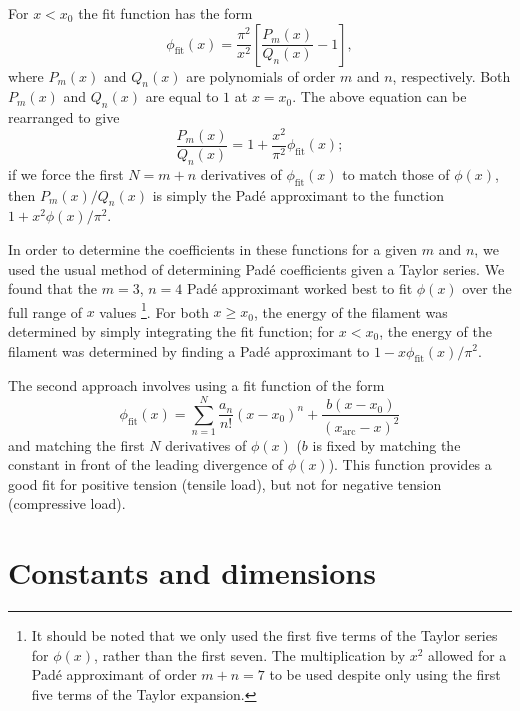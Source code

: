 \documentclass[pre,floatfix,twocolumn]{revtex4}
\begin{document}
For $x<x_0$ the fit function has the form
\[
\phi_{\text{fit}}(x) = \frac{\pi^2}{x^2}\left[\frac{P_{m}(x)}{Q_{n}(x)}-1\right],
\]
where $P_{m}(x)$ and $Q_{n}(x)$ are polynomials of order $m$ and $n$, respectively.  Both $P_{m}(x)$ and $Q_{n}(x)$ are equal to $1$ at $x=x_0$.  The above equation can be rearranged to give
\[
\frac{P_{m}(x)}{Q_{n}(x)} = 1 + \frac{x^2}{\pi^2}\phi_{\text{fit}}(x);
\]
if we force the first $N=m+n$ derivatives of $\phi_{\text{fit}}(x)$ to match those of $\phi(x)$, then $P_{m}(x)/Q_{n}(x)$ is simply the Pad\'{e} approximant to the function $1 + x^2\phi(x)/\pi^2$.

In order to determine the coefficients in these functions for a given $m$ and $n$, we used the usual method of determining Pad\'{e} coefficients given a Taylor series.  We found that the $m=3$, $n=4$ Pad\'{e} approximant worked best to fit $\phi(x)$ over the full range of $x$ values \footnote{It should be noted that we only used the first five terms of the Taylor series for $\phi(x)$, rather than the first seven.  The multiplication by $x^2$ allowed for a Pad\'{e} approximant of order $m+n=7$ to be used despite only using the first five terms of the Taylor expansion.}.  For both $x\ge x_0$, the energy of the filament was determined by simply integrating the fit function; for $x<x_0$, the energy of the filament was determined by finding a Pad\'{e} approximant to $1-x\phi_{\text{fit}}(x)/\pi^2$.

The second approach involves using a fit function of the form
\[
\phi_{\text{fit}}(x) = \sum_{n=1}^{N}\frac{a_{n}}{n!}(x-x_0)^n + \frac{b(x-x_0)}{(x_{\text{arc}}-x)^2}
\]
and matching the first $N$ derivatives of $\phi(x)$ ($b$ is fixed by matching the constant in front of the leading divergence of $\phi(x)$).  This function provides a good fit for positive tension (tensile load), but not for negative tension (compressive load).
\section{Constants and dimensions}
\end{document}
